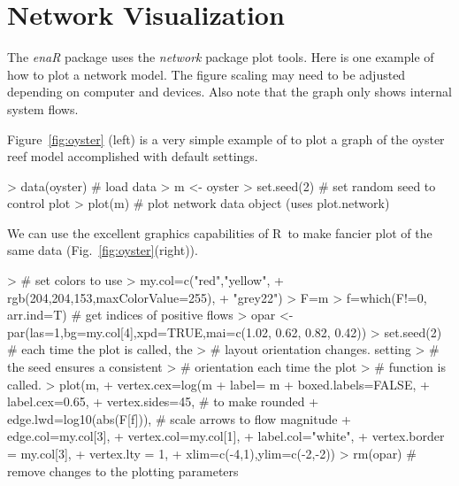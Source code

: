 \documentclass[11pt]{article}
\def\R{\textsf{R}}
\begin{document}
\section{Network Visualization}

The \textit{enaR} package uses the \textit{network} package plot tools. Here is
one example of how to plot a network model. The figure scaling may
need to be adjusted depending on computer and devices. Also note that
the graph only shows internal system flows.

Figure~\ref{fig:oyster} (left) is a very simple example of to plot a
graph of the oyster reef model accomplished with default settings.


\begin{Schunk}
\begin{Sinput}
> data(oyster)  # load data
> m <- oyster  
> set.seed(2)    # set random seed to control plot
> plot(m)       # plot network data object (uses plot.network)
\end{Sinput}
\end{Schunk}

We can use the excellent graphics capabilities of \R\ to make fancier
plot of the same data (Fig.~\ref{fig:oyster}(right)).


\begin{Schunk}
\begin{Sinput}
> # set colors to use
> my.col=c("red","yellow", 
+    rgb(204,204,153,maxColorValue=255), 
+    "grey22")  
> F=m%
> f=which(F!=0, arr.ind=T)       # get indices of positive flows
> opar <- par(las=1,bg=my.col[4],xpd=TRUE,mai=c(1.02, 0.62, 0.82, 0.42))
> set.seed(2)                    # each time the plot is called, the
>                                # layout orientation changes.  setting
>                                # the seed ensures a consistent
>                                # orientation each time the plot
>                                # function is called.
> plot(m,
+       vertex.cex=log(m%
+       label= m%
+       boxed.labels=FALSE,
+       label.cex=0.65,
+       vertex.sides=45,   # to make rounded
+       edge.lwd=log10(abs(F[f])),     # scale arrows to flow magnitude
+       edge.col=my.col[3],
+       vertex.col=my.col[1],
+       label.col="white",
+       vertex.border = my.col[3],
+       vertex.lty = 1,
+       xlim=c(-4,1),ylim=c(-2,-2))
> rm(opar)             # remove changes to the plotting parameters
\end{Sinput}
\end{Schunk}
\end{document}
